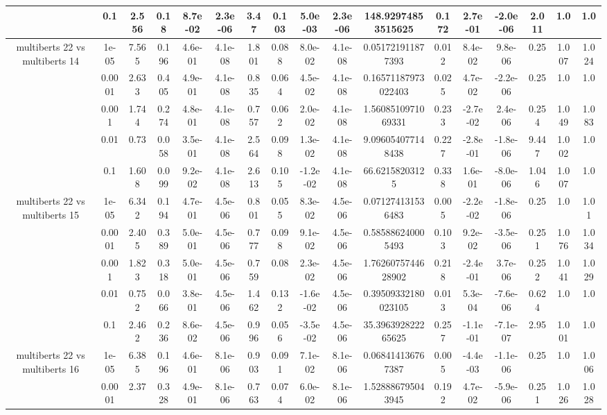 \begin{tabular}{|c|c|c|c|c|c|c|c|c|c|c|c|c|c|c|c|c|}
 & 0.1 & 2.556 & 0.18 & 8.7e-02 & 2.3e-06 & 3.47 & 0.103 & 5.0e-03 & 2.3e-06 & 148.92974853515625 & 0.172 & 2.7e-01 & -2.0e-06 & 2.011 & 1.0 & 1.0 \\
\hline
\multirow{5}{*}{multiberts 22 vs multiberts 14} & 1e-05 & 7.565 & 0.196 & 4.6e-01 & 4.1e-08 & 1.801 & 0.088 & 8.0e-02 & 4.1e-08 & 0.051721911877393 & 0.012 & 8.4e-02 & 9.8e-06 & 0.25 & 1.007 & 1.024 \\
 & 0.0001 & 2.633 & 0.405 & 4.9e-01 & 4.1e-08 & 0.835 & 0.064 & 4.5e-02 & 4.1e-08 & 0.16571187973022403 & 0.025 & 4.7e-02 & -2.2e-06 & 0.25 & 1.0 & 1.0 \\
 & 0.001 & 1.744 & 0.274 & 4.8e-01 & 4.1e-08 & 0.757 & 0.062 & 2.0e-02 & 4.1e-08 & 1.5608510971069331 & 0.233 & -2.7e-02 & 2.4e-06 & 0.254 & 1.049 & 1.083 \\
 & 0.01 & 0.73 & 0.058 & 3.5e-01 & 4.1e-08 & 2.564 & 0.098 & 1.3e-02 & 4.1e-08 & 9.096054077148438 & 0.227 & -2.8e-01 & -1.8e-06 & 9.447 & 1.002 & 1.0 \\
 & 0.1 & 1.608 & 0.099 & 9.2e-02 & 4.1e-08 & 2.613 & 0.105 & -1.2e-02 & 4.1e-08 & 66.62158203125 & 0.338 & 1.6e-01 & -8.0e-06 & 1.046 & 1.007 & 1.0 \\
\hline
\multirow{5}{*}{multiberts 22 vs multiberts 15} & 1e-05 & 6.342 & 0.194 & 4.7e-01 & 4.5e-06 & 0.801 & 0.055 & 8.3e-02 & 4.5e-06 & 0.071274131536483 & 0.005 & -2.2e-02 & -1.8e-06 & 0.25 & 1.0 & 1.01 \\
 & 0.0001 & 2.405 & 0.389 & 5.0e-01 & 4.5e-06 & 0.777 & 0.098 & 9.1e-02 & 4.5e-06 & 0.585886240005493 & 0.103 & 9.2e-02 & -3.5e-06 & 0.251 & 1.076 & 1.034 \\
 & 0.001 & 1.823 & 0.318 & 5.0e-01 & 4.5e-06 & 0.759 & 0.08 & 2.3e-02 & 4.5e-06 & 1.7626075744628902 & 0.218 & -2.4e-01 & 3.7e-06 & 0.252 & 1.041 & 1.029 \\
 & 0.01 & 0.752 & 0.066 & 3.8e-01 & 4.5e-06 & 1.462 & 0.132 & -1.6e-02 & 4.5e-06 & 0.39509332180023105 & 0.013 & 5.3e-04 & -7.6e-06 & 0.624 & 1.0 & 1.0 \\
 & 0.1 & 2.462 & 0.236 & 8.6e-02 & 4.5e-06 & 0.996 & 0.056 & -3.5e-02 & 4.5e-06 & 35.396392822265625 & 0.257 & -1.1e-01 & -7.1e-07 & 2.95 & 1.001 & 1.0 \\
\hline
\multirow{5}{*}{multiberts 22 vs multiberts 16} & 1e-05 & 6.385 & 0.196 & 4.6e-01 & 8.1e-06 & 0.903 & 0.091 & 7.1e-02 & 8.1e-06 & 0.068414136767387 & 0.005 & -4.4e-03 & -1.1e-06 & 0.25 & 1.0 & 1.006 \\
 & 0.0001 & 2.37 & 0.328 & 4.9e-01 & 8.1e-06 & 0.763 & 0.074 & 6.0e-02 & 8.1e-06 & 1.528886795043945 & 0.192 & 4.7e-02 & -5.9e-06 & 0.251 & 1.026 & 1.028 \\

\end{tabular}
